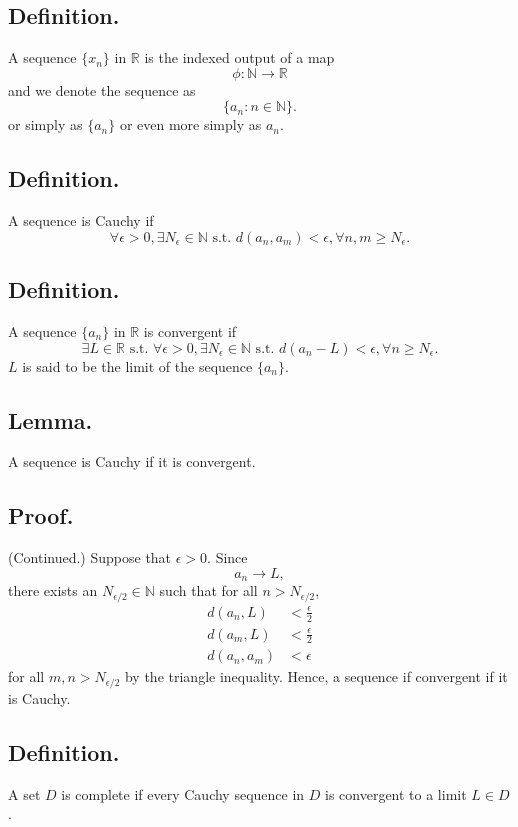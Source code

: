 \documentclass[titlepage]{article}
\begin{document}
\subsection{Definition.} A sequence $\{x_{n}\}$ in $\mathbb{R}$ is the indexed output of a map 
$$\phi: \mathbb{N} \to \mathbb{R}$$
and we denote the sequence as 
$$\{a_{n}: n \in \mathbb{N}\}.$$
or simply as $\{a_{n}\}$ or even more simply as $a_{n}$.

\subsection{Definition.} A sequence is Cauchy if 
$$\forall \epsilon > 0, \exists N_{\epsilon} \in \mathbb{N} \text{ s.t. } d(a_{n}, a_{m}) < \epsilon, \forall n,m \geq N_{\epsilon}.$$

\subsection{Definition.} A sequence $\{a_{n}\}$ in $\mathbb{R}$ is convergent if 
$$\exists L \in \mathbb{R} \text{ s.t. } \forall \epsilon > 0, \exists N_{\epsilon} \in \mathbb{N} \text{ s.t. } d(a_{n} - L) < \epsilon, \forall n \geq N_{\epsilon}.$$
$L$ is said to be the limit of the sequence $\{a_{n}\}$.

\subsection{Lemma.} A sequence is Cauchy if it is convergent.

\subsection{Proof.} (Continued.) Suppose that $\epsilon > 0$. Since 
$$a_{n} \rightarrow L,$$
there exists an $N_{\epsilon/2} \in \mathbb{N}$ such that for all $n > N_{\epsilon/2}$,
\begin{align*}
        d(a_{n}, L) &< \frac{\epsilon}{2} \\
        d(a_{m}, L) &< \frac{\epsilon}{2} \\
    d(a_{n}, a_{m}) &< \epsilon
\end{align*}
for all $m, n > N_{\epsilon/2}$ by the triangle inequality. Hence, a sequence if convergent if it is Cauchy.

\subsection{Definition.} A set $D$ is complete if every Cauchy sequence in $D$ is convergent to a limit $L \in D$.
\end{document}
